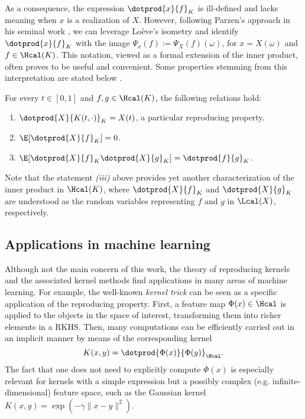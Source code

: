 As a consequence, the expression \(\dotprod{x}{f}_K\) is ill-defined and lacks meaning when \(x\) is a realization of \(X\). However, following Parzen's approach in his seminal work \citep[e.g.][Th.~4E]{parzen1961approach}, we can leverage Loève's isometry and identify \(\dotprod{x}{f}_K \) with the image \( \Psi_x(f) := \Psi_X(f)(\omega)\), for \(x=X(\omega)\) and \(f\in \Hcal(K)\). This notation, viewed as a formal extension of the inner product, often proves to be useful and convenient. Some properties stemming from this interpretation are stated below \citep[see][p.~974]{parzen1961approach}.

\setlength{\headsep}{21.75pt}

\begin{proposition}
  For every \(t\in[0,1]\) and \(f, g \in \Hcal(K)\), the following relations hold:
\begin{enumerate}
  \item \(\dotprod{X}{K(t, \cdot)}_K = X(t)\), a particular reproducing property.
  \item \(\E[\dotprod{X}{f}_K] = 0\).
  \item \(\E[\dotprod{X}{f}_K\dotprod{X}{g}_K] = \dotprod{f}{g}_K\).
\end{enumerate}
\end{proposition}
Note that the statement \textit{(iii)} above provides yet another characterization of the inner product in \(\Hcal(K)\), where \(\dotprod{X}{f}_K\) and \(\dotprod{X}{g}_K\) are understood as the random variables representing \(f\) and \(g\) in \(\Lcal(X)\), respectively.


\subsection*{Applications in machine learning}

Although not the main concern of this work, the theory of reproducing kernels and the associated kernel methods find applications in many areas of machine learning. For example, the well-known \textit{kernel trick} can be seen as a specific application of the reproducing property. First, a feature map \(\Phi(x) \in \Hcal\) is applied to the objects in the space of interest, transforming them into richer elements in a RKHS. Then, many computations can be efficiently carried out in an implicit manner by means of the corresponding kernel
\[
K(x, y)=\dotprod{\Phi(x)}{\Phi(y)}_{\Hcal}.
\]
The fact that one does not need to explicitly compute \(\Phi(x)\) is especially relevant for kernels with a simple expression but a possibly complex (e.g. infinite-dimensional) feature space, such as the Gaussian kernel \(K(x, y)=\exp(-\gamma\|x-y\|^2)\).

